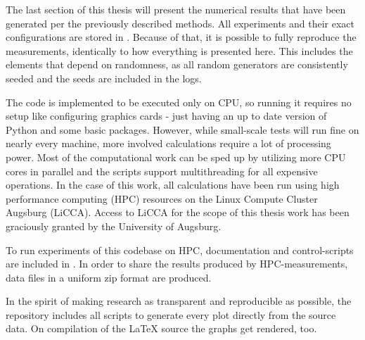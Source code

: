 The last section of this thesis will present the numerical results that have been generated per the previously described methods.
All experiments and their exact configurations are stored in 
.
Because of that, it is possible to fully reproduce the measurements, identically to how everything is presented here.
This includes the elements that depend on randomness, as all random generators are consistently seeded and the seeds are included in the logs.

The code is implemented to be executed only on CPU, so running it requires no setup like configuring graphics cards - just having an up to date version of Python and some basic packages.
However, while small-scale tests will run fine on nearly every machine, more involved calculations require a lot of processing power.
Most of the computational work can be sped up by utilizing more CPU cores in parallel and the scripts support multithreading for all expensive operations.
In the case of this work, all calculations have been run using high performance computing (HPC) resources on the Linux Compute Cluster Augsburg (LiCCA).
Access to LiCCA for the scope of this thesis work has been graciously granted by the University of Augsburg.

To run experiments of this codebase on HPC, documentation and control-scripts are included in .
In order to share the results produced by HPC-measurements, data files in a uniform zip format are produced.

In the spirit of making research as transparent and reproducible as possible, the repository  includes all scripts to generate every plot directly from the source data.
On compilation of the \LaTeX{} source the graphs get rendered, too.
